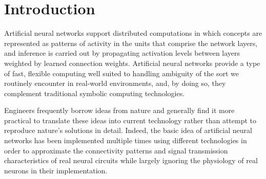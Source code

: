 

\section{Introduction}



Artificial neural networks support distributed computations in which concepts are represented as patterns of activity in the units that comprise the network layers, and inference is carried out by propagating activation levels between layers weighted by learned connection weights.  Artificial neural networks provide a type of fast, flexible computing well suited to handling ambiguity of the sort we routinely encounter in real-world environments, and, by doing so, they complement traditional symbolic computing technologies.

Engineers frequently borrow ideas from nature and generally find it more practical to translate these ideas into current technology rather than attempt to reproduce nature's solutions in detail. Indeed, the basic idea of artificial neural networks has been implemented multiple times using different technologies in order to approximate the connectivity patterns and signal transmission characteristics of real neural circuits while largely ignoring the physiology of real neurons in their implementation. 



